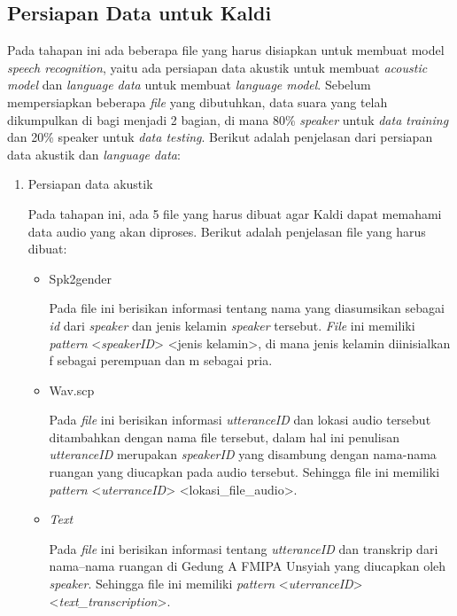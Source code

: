 \subsection{Persiapan Data untuk Kaldi}
Pada tahapan ini ada beberapa file yang harus disiapkan untuk membuat model \textit{speech recognition}, yaitu ada persiapan data akustik untuk membuat \textit{acoustic model} dan \textit{language data} untuk membuat \textit{language model}. Sebelum mempersiapkan beberapa \textit{file} yang dibutuhkan, data suara yang telah dikumpulkan di bagi menjadi 2 bagian, di mana 80\% \textit{speaker} untuk \textit{data training} dan 20\% speaker untuk \textit{data testing}. Berikut adalah penjelasan dari persiapan data akustik dan \textit{language data}:

\begin{enumerate}
\item Persiapan data akustik
\par Pada tahapan ini, ada 5 file yang harus dibuat agar Kaldi dapat memahami data audio yang akan diproses. Berikut adalah penjelasan file yang harus dibuat:
	\begin{itemize}
	\item Spk2gender
	\par Pada file ini berisikan informasi tentang nama yang diasumsikan sebagai \textit{id} dari \textit{speaker} dan jenis kelamin \textit{speaker} tersebut. \textit{File} ini memiliki \textit{pattern} <\textit{speakerID}> <jenis kelamin>, di mana jenis kelamin diinisialkan f sebagai perempuan dan m sebagai pria.
	
	\item Wav.scp
	\par Pada \textit{file} ini berisikan informasi \textit{utteranceID} dan lokasi audio tersebut ditambahkan dengan nama file tersebut, dalam hal ini penulisan \textit{utteranceID} merupakan \textit{speakerID} yang disambung dengan nama-nama ruangan yang diucapkan pada audio tersebut. Sehingga file ini memiliki \textit{pattern} <\textit{uterranceID}> <lokasi\_file\_audio>.	
	
	\item \textit{Text}
	\par Pada \textit{file} ini berisikan informasi tentang \textit{utteranceID} dan transkrip dari nama--nama ruangan di Gedung A FMIPA Unsyiah yang diucapkan oleh \textit{speaker}. Sehingga file ini memiliki \textit{pattern} <\textit{uterranceID}> <\textit{text\_transcription}>.
	

\end{itemize}
\end{enumerate}
